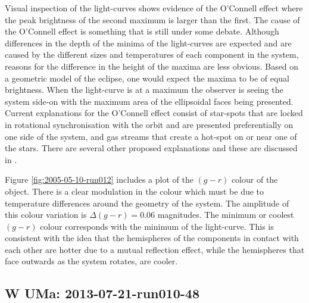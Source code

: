 Visual inspection of the light-curves shows evidence of the O'Connell effect where the peak brightness of the second maximum is larger than the first. The cause of the O'Connell effect is something that is still under some debate. Although differences in the depth of the minima of the light-curves are expected and are caused by the different sizes and temperatures of each component in the system, reasons for the difference in the height of the maxima are less obvious. Based on a geometric model of the eclipse, one would expect the maxima to be of equal brightness. When the light-curve is at a maximum the observer is seeing the system side-on with the maximum area of the ellipsoidal faces being presented. Current explanations for the O'Connell effect consist of star-spots that are locked in rotational synchronisation with the orbit and are presented preferentially on one side of the system, and gas streams that create a hot-spot on or near one of the stars. There are several other proposed explanations and these are discussed in \citet{oconnelleffect}.  

Figure \ref{fig:2005-05-10-run012} includes a plot of the $(g-r)$ colour of the object. There is a clear modulation in the colour which must be due to temperature differences around the geometry of the system. The amplitude of this colour variation is $\Delta(g-r) = 0.06$ magnitudes. The minimum or coolest $(g - r)$ colour corresponds with the minimum of the light-curve. This is consistent with the idea that the hemispheres of the components in contact with each other are hotter due to a mutual reflection effect, while the hemispheres that face outwards as the system rotates, are cooler. 

\subsection{{W UMa}: 2013-07-21-run010-48}

